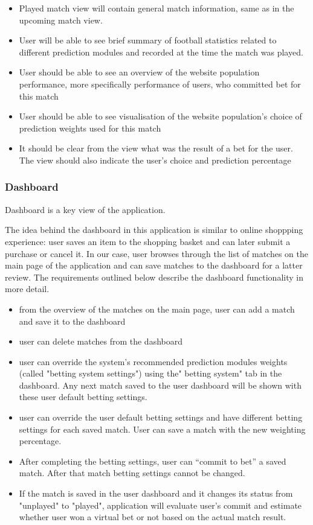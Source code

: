 \begin{itemize}
	\item Played match view will contain general match information, same as in the upcoming match view.
	\item User will be able to see brief summary of football statistics related to different prediction modules and recorded at the time the match was played.
	\item User should be able to see an overview of the website population performance, more specifically performance of users, who committed bet for this match
	\item User should be able to see visualisation of the website population's choice of prediction weights used for this match
	\item It should be clear from the view what was the result of a bet for the user. The view should also indicate the user's choice and prediction percentage
\end{itemize}

\subsubsection{Dashboard}
\label{subsubsec:dashboard_req}
Dashboard is a key view of the application.

The idea behind the dashboard in this application is similar to online shoppping experience: user saves an item to the shopping basket and can later submit a purchase or cancel it. In our case, user browses through the list of matches on the main page of the application and can save matches to the dashboard for a latter review. The requirements outlined below describe the dashboard functionality in more detail.

\begin{itemize}
	\item from the overview of the matches on the main page, user can add a match and save it to the dashboard
	\item user can delete matches from the dashboard
	\item user can override the system's recommended prediction modules weights (called "betting system settings") using the" betting system" tab in the dashboard. 	Any next match saved to the user dashboard will be shown with these user default betting settings. 
	\item user can override the user default betting settings and have different betting  settings for each saved match. User can save a match with the new weighting percentage.
	\item After completing the betting settings, user can “commit to bet” a saved match. After that match betting settings cannot be changed.
	\item If the match is saved in the user dashboard and it changes its status from "unplayed" to "played", application will evaluate user's commit and estimate whether user won a virtual bet or not based on the actual match result. 
\end{itemize}


